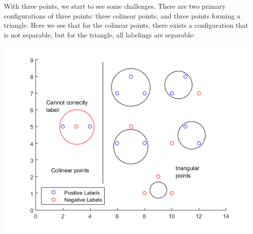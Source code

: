 \documentclass[11pt,a4paper]{article}
\begin{document}
\begin{itemize}
\begin{enumerate} [label={\alph*)}]
					With three points, we start to see some challenges. There are two primary configurations of three points: three colinear points, and three points forming a triangle. Here we see that for the colinear points, there exists a configuration that is not separable, but for the triangle, all labelings are separable:
					\begin{center}
						\includegraphics[width=1\linewidth]{q3a_2}
					\end{center}
					

\end{enumerate}
\end{itemize}
\end{document}
